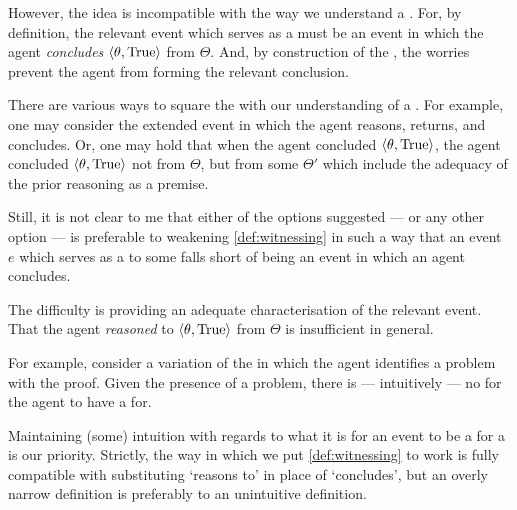\begin{note}
  However, the idea is incompatible with the way we understand a .
  For, by definition, the relevant event which serves as a  must be an event in which the agent \emph{concludes} \(\langle \theta, \text{True} \rangle\) from \(\Theta\).
  And, by construction of the , the \agents{} worries prevent the agent from forming the relevant conclusion.

  There are various ways to square the  with our understanding of a .
  For example, one may consider the extended event in which the agent reasons, returns, and concludes.
  Or, one may hold that when the agent concluded \(\langle \theta, \text{True} \rangle\), the agent concluded \(\langle \theta, \text{True} \rangle\) not from \(\Theta\), but from some \poP{} \(\Theta'\) which include the adequacy of the \agents{} prior reasoning as a premise.

  Still, it is not clear to me that either of the options suggested --- or any other option --- is preferable to weakening \autoref{def:witnessing} in such a way that an event \(e\) which serves as a \wit{} to some \ros{} falls short of being an event in which an agent concludes.

  The difficulty is providing an adequate characterisation of the relevant event.
  That the agent \emph{reasoned} to \(\langle \theta, \text{True} \rangle\) from \(\Theta\) is insufficient in general.

  For example, consider a variation of the \scen{} in which the agent identifies a problem with the proof.
  Given the presence of a problem, there is --- intuitively --- no \ros{} for the agent to have a  for.

  Maintaining (some) intuition with regards to what it is for an event to be a  for a  is our priority.
  Strictly, the way in which we put \autoref{def:witnessing} to work is fully compatible with substituting `reasons to' in place of `concludes', but an overly narrow definition is preferably to an unintuitive definition.
\end{note}

\subsection{\supportII{}}
\label{cha:var:ros:II}

